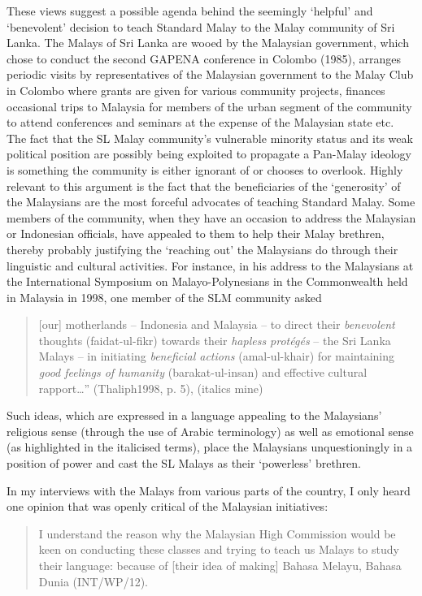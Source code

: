 These views suggest a possible agenda behind the seemingly `helpful' and `benevolent' decision to teach Standard Malay to the Malay community of Sri Lanka. The Malays of Sri Lanka are wooed by the Malaysian government, which chose to conduct the second GAPENA conference in Colombo (1985), arranges periodic visits by representatives of the Malaysian government to the Malay Club in Colombo where grants are given for various community projects, finances occasional trips to Malaysia for members of the urban segment of the community to attend conferences and seminars at the expense of the Malaysian state etc. The fact that the SL Malay community's vulnerable minority status and its weak political position are possibly being exploited to propagate a Pan-Malay ideology is something the community is either ignorant of or chooses to overlook. Highly relevant to this argument is the fact that the beneficiaries of the `generosity' of the Malaysians are the most forceful advocates of teaching Standard Malay. Some members of the community, when they have an occasion to address the Malaysian or Indonesian officials, have appealed to them to help their Malay brethren, thereby probably justifying the `reaching out' the Malaysians do through their linguistic and cultural activities. For instance, in his address to the Malaysians at the International Symposium on Malayo-Polynesians in the Commonwealth held in Malaysia in 1998, one member of the SLM community asked 

\begin{quote}
[our] motherlands -- Indonesia and Malaysia -- to direct their \textit{benevolent} thoughts (faidat-ul-fikr) towards their \textit{hapless prot\'eg\'es} -- the Sri Lanka Malays -- in initiating \textit{beneficial actions} (amal-ul-khair) for maintaining \textit{good feelings of humanity} (barakat-ul-insan) and effective cultural rapport{\dots}'' (Thaliph1998, p. 5), (italics mine)
\end{quote}

Such ideas, which are expressed in a language appealing to the Malaysians' religious sense (through the use of Arabic terminology) as well as emotional sense (as highlighted in the italicised terms), place the Malaysians unquestioningly in a position of power and cast the SL Malays as their `powerless' brethren. 

In my interviews with the Malays from various parts of the country, I only heard one opinion that was openly critical of the Malaysian initiatives: 

\begin{quote}
I understand the reason why the Malaysian High Commission would be keen on conducting these classes and trying to teach us Malays to study their language: because of [their idea of making] Bahasa Melayu, Bahasa Dunia (INT/WP/12).
\end{quote}

